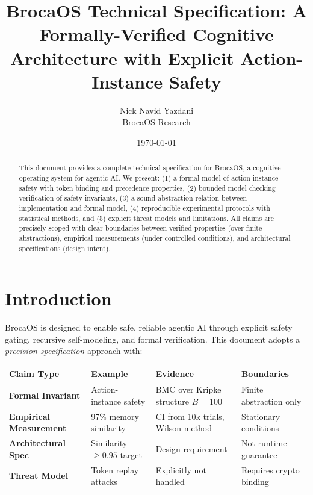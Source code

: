 \documentclass[12pt]{article}
\title{BrocaOS Technical Specification: A Formally-Verified Cognitive Architecture with Explicit Action-Instance Safety}
\author{Nick Navid Yazdani\\BrocaOS Research}
\date{\today}
\begin{document}
\maketitle

\begin{abstract}
This document provides a complete technical specification for BrocaOS, a cognitive operating system for agentic AI. We present: (1) a formal model of action-instance safety with token binding and precedence properties, (2) bounded model checking verification of safety invariants, (3) a sound abstraction relation between implementation and formal model, (4) reproducible experimental protocols with statistical methods, and (5) explicit threat models and limitations. All claims are precisely scoped with clear boundaries between verified properties (over finite abstractions), empirical measurements (under controlled conditions), and architectural specifications (design intent).
\end{abstract}

\section{Introduction}

BrocaOS is designed to enable safe, reliable agentic AI through explicit safety gating, recursive self-modeling, and formal verification. This document adopts a \emph{precision specification} approach with:

\begin{center}
\small
\begin{tabular}{@{}p{}p{}p{}p{}@{}}
\toprule
\textbf{Claim Type} & \textbf{Example} & \textbf{Evidence} & \textbf{Boundaries} \\
\midrule
\textbf{Formal Invariant} & Action-instance safety & BMC over Kripke structure $B=100$ & Finite abstraction only \\
\textbf{Empirical Measurement} & 97\% memory similarity & CI from 10k trials, Wilson method & Stationary conditions \\
\textbf{Architectural Spec} & Similarity $\geq 0.95$ target & Design requirement & Not runtime guarantee \\
\textbf{Threat Model} & Token replay attacks & Explicitly not handled & Requires crypto binding \\
\bottomrule
\end{tabular}
\end{center}
\end{document}
